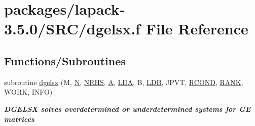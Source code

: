 \hypertarget{dgelsx_8f}{}\section{packages/lapack-\/3.5.0/\+S\+R\+C/dgelsx.f File Reference}
\label{dgelsx_8f}
\subsection*{Functions/\+Subroutines}
\begin{DoxyCompactItemize}
\item 
subroutine \hyperlink{group__doubleGEsolve_ga6252143bd7183eb34700395cbe013ff6}{dgelsx} (M, \hyperlink{polmisc_8c_a0240ac851181b84ac374872dc5434ee4}{N}, \hyperlink{example__user_8c_aa0138da002ce2a90360df2f521eb3198}{N\+R\+H\+S}, \hyperlink{classA}{A}, \hyperlink{example__user_8c_ae946da542ce0db94dced19b2ecefd1aa}{L\+D\+A}, B, \hyperlink{example__user_8c_a50e90a7104df172b5a89a06c47fcca04}{L\+D\+B}, J\+P\+V\+T, \hyperlink{superlu__enum__consts_8h_af00a42ecad444bbda75cde1b64bd7e72a9b5c151728d8512307565994c89919d5}{R\+C\+O\+N\+D}, \hyperlink{splinemodule_8c_a3a88bcc63386de30443dacede2e01847}{R\+A\+N\+K}, W\+O\+R\+K, I\+N\+F\+O)
\begin{DoxyCompactList}\small\item\em {\bfseries  D\+G\+E\+L\+S\+X solves overdetermined or underdetermined systems for G\+E matrices} \end{DoxyCompactList}\end{DoxyCompactItemize}
